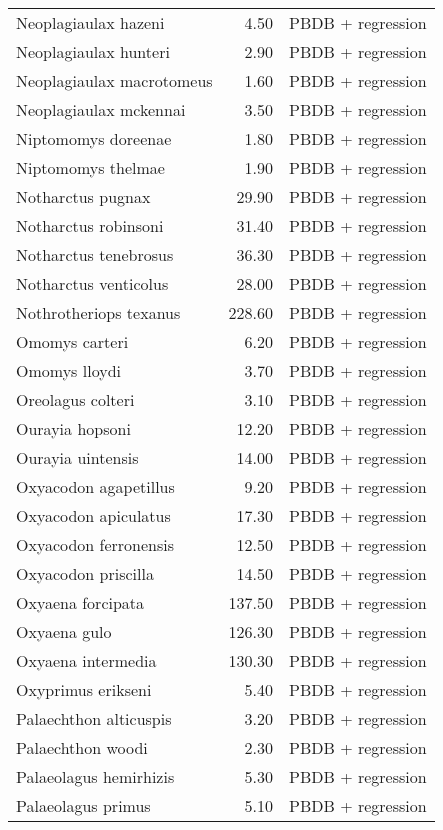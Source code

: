 \begin{table}[ht]
\begin{tabular}{lrl}
  Neoplagiaulax hazeni & 4.50 & PBDB + regression \\ 
  Neoplagiaulax hunteri & 2.90 & PBDB + regression \\ 
  Neoplagiaulax macrotomeus & 1.60 & PBDB + regression \\ 
  Neoplagiaulax mckennai & 3.50 & PBDB + regression \\ 
  Niptomomys doreenae & 1.80 & PBDB + regression \\ 
  Niptomomys thelmae & 1.90 & PBDB + regression \\ 
  Notharctus pugnax & 29.90 & PBDB + regression \\ 
  Notharctus robinsoni & 31.40 & PBDB + regression \\ 
  Notharctus tenebrosus & 36.30 & PBDB + regression \\ 
  Notharctus venticolus & 28.00 & PBDB + regression \\ 
  Nothrotheriops texanus & 228.60 & PBDB + regression \\ 
  Omomys carteri & 6.20 & PBDB + regression \\ 
  Omomys lloydi & 3.70 & PBDB + regression \\ 
  Oreolagus colteri & 3.10 & PBDB + regression \\ 
  Ourayia hopsoni & 12.20 & PBDB + regression \\ 
  Ourayia uintensis & 14.00 & PBDB + regression \\ 
  Oxyacodon agapetillus & 9.20 & PBDB + regression \\ 
  Oxyacodon apiculatus & 17.30 & PBDB + regression \\ 
  Oxyacodon ferronensis & 12.50 & PBDB + regression \\ 
  Oxyacodon priscilla & 14.50 & PBDB + regression \\ 
  Oxyaena forcipata & 137.50 & PBDB + regression \\ 
  Oxyaena gulo & 126.30 & PBDB + regression \\ 
  Oxyaena intermedia & 130.30 & PBDB + regression \\ 
  Oxyprimus erikseni & 5.40 & PBDB + regression \\ 
  Palaechthon alticuspis & 3.20 & PBDB + regression \\ 
  Palaechthon woodi & 2.30 & PBDB + regression \\ 
  Palaeolagus hemirhizis & 5.30 & PBDB + regression \\ 
  Palaeolagus primus & 5.10 & PBDB + regression \\ 

\end{tabular}
\end{table}
